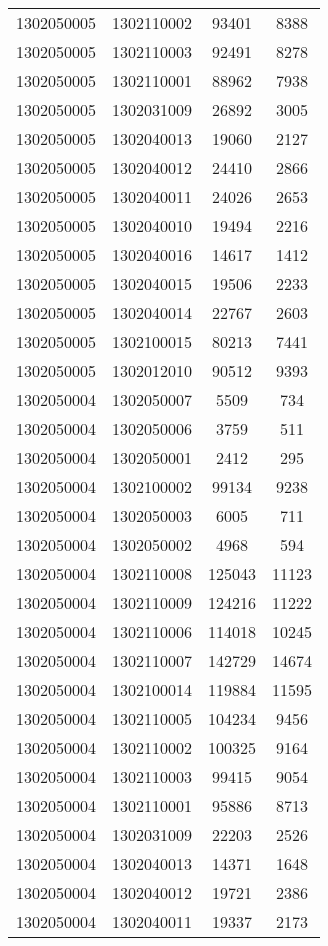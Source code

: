 \begin{longtable}[h]{llcc}
		1302050005 & 1302110002 & 93401 & 8388\\
		1302050005 & 1302110003 & 92491 & 8278\\
		1302050005 & 1302110001 & 88962 & 7938\\
		1302050005 & 1302031009 & 26892 & 3005\\
		1302050005 & 1302040013 & 19060 & 2127\\
		1302050005 & 1302040012 & 24410 & 2866\\
		1302050005 & 1302040011 & 24026 & 2653\\
		1302050005 & 1302040010 & 19494 & 2216\\
		1302050005 & 1302040016 & 14617 & 1412\\
		1302050005 & 1302040015 & 19506 & 2233\\
		1302050005 & 1302040014 & 22767 & 2603\\
		1302050005 & 1302100015 & 80213 & 7441\\
		1302050005 & 1302012010 & 90512 & 9393\\
		1302050004 & 1302050007 & 5509 & 734\\
		1302050004 & 1302050006 & 3759 & 511\\
		1302050004 & 1302050001 & 2412 & 295\\
		1302050004 & 1302100002 & 99134 & 9238\\
		1302050004 & 1302050003 & 6005 & 711\\
		1302050004 & 1302050002 & 4968 & 594\\
		1302050004 & 1302110008 & 125043 & 11123\\
		1302050004 & 1302110009 & 124216 & 11222\\
		1302050004 & 1302110006 & 114018 & 10245\\
		1302050004 & 1302110007 & 142729 & 14674\\
		1302050004 & 1302100014 & 119884 & 11595\\
		1302050004 & 1302110005 & 104234 & 9456\\
		1302050004 & 1302110002 & 100325 & 9164\\
		1302050004 & 1302110003 & 99415 & 9054\\
		1302050004 & 1302110001 & 95886 & 8713\\
		1302050004 & 1302031009 & 22203 & 2526\\
		1302050004 & 1302040013 & 14371 & 1648\\
		1302050004 & 1302040012 & 19721 & 2386\\
		1302050004 & 1302040011 & 19337 & 2173\\

\end{longtable}
